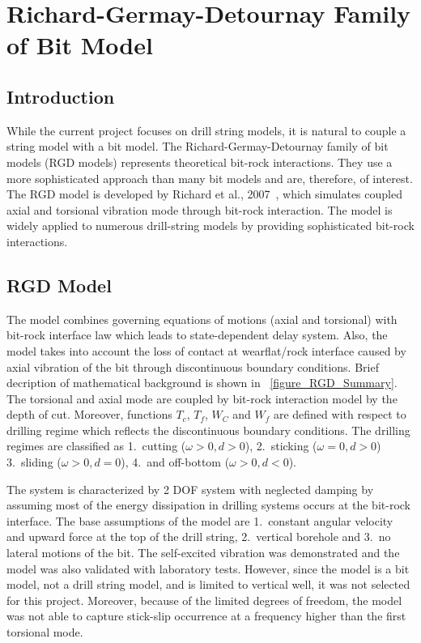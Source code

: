 \section{Richard-Germay-Detournay Family of Bit Model}
\label{ch:rgdmodels}

\subsection{Introduction}
While the current project focuses on drill string models, it is natural to couple a string model with a bit model. The Richard-Germay-Detournay family of bit models (RGD models) represents theoretical bit-rock interactions. They use a more sophisticated approach than many bit models and are, therefore, of interest. The RGD model is developed by Richard et al., 2007\ \cite{ref:richard2007a}, which simulates coupled axial and torsional vibration mode through bit-rock interaction. The model is widely applied to numerous drill-string models by providing sophisticated bit-rock interactions.
\subsection{RGD Model}
The model combines governing equations of motions (axial and torsional) with bit-rock interface law which leads to state-dependent delay system. Also, the model takes into account the loss of contact at wearflat/rock interface caused by axial vibration of the bit through discontinuous boundary conditions. Brief decription of mathematical background is shown in \figurename~\ref{figure_RGD_Summary}. The torsional and axial mode are coupled by bit-rock interaction model by the depth of cut. Moreover, functions $T_c$, $T_f$, $W_C$ and $W_f$ are defined with respect to drilling regime which reflects the discontinuous boundary conditions. The drilling regimes are classified as 1.\ cutting ($\omega>0, d>0$), 2.\ sticking ($\omega=0, d>0$) 3.\ sliding ($\omega>0, d=0$), 4.\ and off-bottom ($\omega>0, d<0$). 

The system is characterized by 2 DOF system with neglected damping by assuming most of the energy dissipation in drilling systems occurs at the bit-rock interface. The base assumptions of the model are 1.\ constant angular velocity and upward force at the top of the drill string, 2.\ vertical borehole and 3.\ no lateral motions of the bit. The self-excited vibration was demonstrated and the model was also validated with laboratory tests. However, since the model is a bit model, not a drill string model, and is limited to vertical well, it was not selected for this project. Moreover, because of the limited degrees of freedom, the model was not able to capture stick-slip occurrence at a frequency higher than the first torsional mode. 


